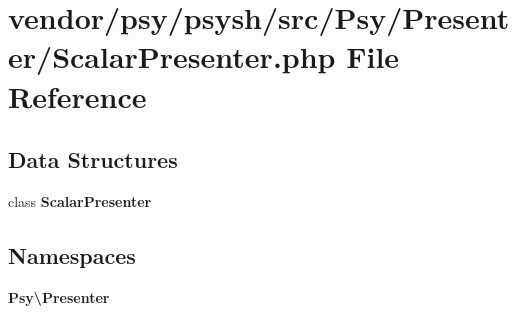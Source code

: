 \section{vendor/psy/psysh/src/\+Psy/\+Presenter/\+Scalar\+Presenter.php File Reference}
\label{_scalar_presenter_8php}
\subsection*{Data Structures}
\begin{DoxyCompactItemize}
\item 
class {\bf Scalar\+Presenter}
\end{DoxyCompactItemize}
\subsection*{Namespaces}
\begin{DoxyCompactItemize}
\item 
 {\bf Psy\textbackslash{}\+Presenter}
\end{DoxyCompactItemize}
